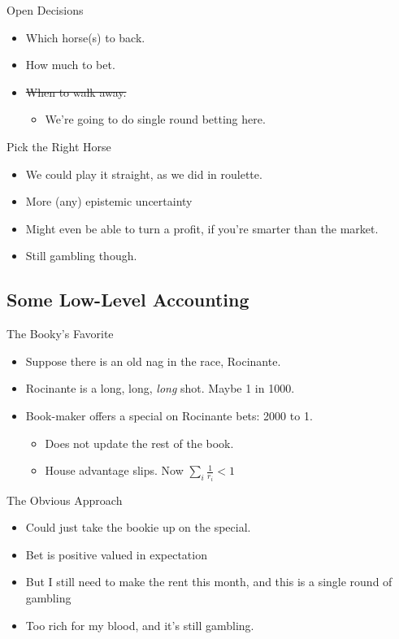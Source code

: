 \documentclass[pdf]{beamer}
\begin{document}
\begin{frame}{Open Decisions}
  \begin{itemize}
  \item Which horse(s) to back.
  \pause\item How much to bet.
  \pause\item \sout{When to walk away.}
    \begin{itemize}
      \item We're going to do single round betting here.
    \end{itemize}
  \end{itemize}
\end{frame}

\begin{frame}{Pick the Right Horse}
  \begin{itemize}
  \item We could play it straight, as we did in roulette.
  \pause\item More (any) epistemic uncertainty
  \pause\item Might even be able to turn a profit, if you're smarter than the market.
  \pause\item Still gambling though.
  \end{itemize}
\end{frame}


\subsection{Some Low-Level Accounting}
\begin{frame}{The Booky's Favorite}
  \begin{itemize}
  \item Suppose there is an old nag in the race, Rocinante.
  \pause\item Rocinante is a long, long, \emph{long} shot. Maybe 1 in 1000.
  \pause\item Book-maker offers a special on Rocinante bets: 2000 to 1.
    \begin{itemize}
    \item Does not update the rest of the book.
    \item House advantage slips. Now $\sum_i \frac{1}{r_i} < 1$
    \end{itemize}
  \end{itemize}
\end{frame}

\begin{frame}{The Obvious Approach}
  \begin{itemize}
  \item Could just take the bookie up on the special.
  \pause\item Bet is positive valued in expectation
  \pause\item But I still need to make the rent this month, and this is a single round of gambling
  \pause\item Too rich for my blood, and it's still gambling.
  \end{itemize}
\end{frame}
\end{document}
